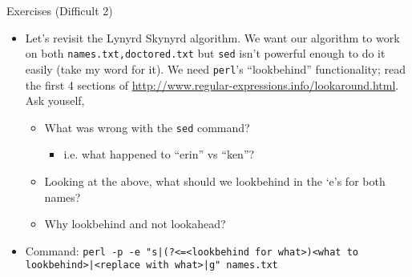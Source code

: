 \documentclass[hyperref={pdfpagelabels=false},12pt]{beamer}
\begin{document}
\begin{frame}{Exercises (Difficult 2)}
\begin{itemize}
    \item Let's revisit the Lynyrd Skynyrd algorithm. We want our algorithm to
    work on both \texttt{names.txt,doctored.txt} but \texttt{sed} isn't
    powerful enough to do it easily (take my word for it). We need
    \texttt{perl}'s ``lookbehind'' functionality; read the first 4 sections of
    \url{http://www.regular-expressions.info/lookaround.html}. Ask youself,
    \begin{itemize}
        \item What was wrong with the \texttt{sed} command?
        \begin{itemize}
            \item i.e. what happened to ``erin'' vs ``ken''?
        \end{itemize}
        \item Looking at the above, what should we lookbehind in the `e's for both names?
        \item Why lookbehind and not lookahead?
    \end{itemize}
    \item Command: \texttt{perl -p -e "s|(?<=<lookbehind for what>)<what to lookbehind>|<replace with what>|g" names.txt}
\end{itemize}
\end{frame}
\end{document}
